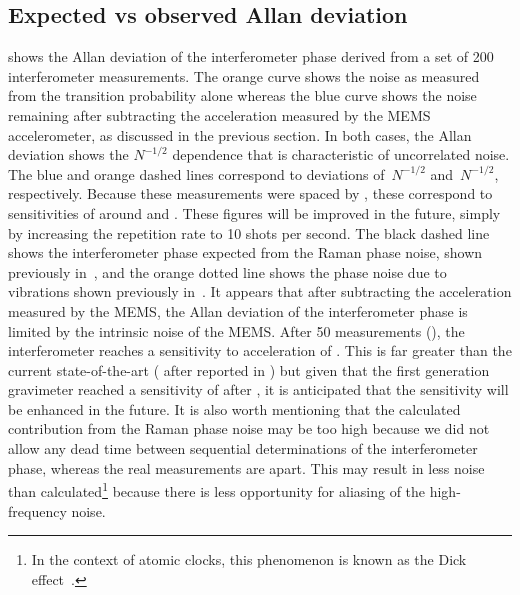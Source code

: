 \subsection{Expected vs observed Allan deviation}\label{subsec:stability}	
 shows the Allan deviation of the
interferometer phase derived from a set of 200 interferometer
measurements. The orange
curve shows the noise as measured from the transition probability
alone whereas the blue curve shows the noise remaining after
subtracting the acceleration measured by the MEMS accelerometer, as
discussed in the previous section. In both
cases, the Allan deviation shows the $N^{-1/2}$ dependence that is
characteristic of uncorrelated noise. The blue and orange dashed
lines correspond to deviations of
\,$N^{-1/2}$ and \,$N^{-1/2}$,
respectively.
Because these measurements were spaced by , these
correspond to sensitivities of around
 and
. These figures will be improved in the future, simply by
increasing the repetition rate to 10 shots per second. The black dashed line shows the interferometer phase
expected from the Raman phase noise, shown previously
in~, and the orange dotted line shows the
phase noise due to vibrations shown previously
in~. It appears that after subtracting the
acceleration measured by the MEMS, the Allan deviation of the
interferometer phase is limited by the intrinsic noise of the MEMS.
After 50 measurements (), the interferometer reaches a sensitivity to
acceleration of . This is far greater than
the current state-of-the-art ( after
 reported in \cite{Barrett2016}) but given that the
first generation gravimeter reached a sensitivity of
 after 
\cite{Kasevich1991}, it is anticipated that the sensitivity will be
enhanced in the future. 
It is also worth mentioning that the calculated contribution from the Raman phase noise may be
too high because we did not allow any dead time between sequential
determinations of the interferometer phase, whereas the real
measurements are  apart. This may result in less
noise than calculated\footnote{In the context of atomic clocks, this phenomenon
is known as the Dick effect~\cite{Dick1990}.} because there is less
opportunity for aliasing of the high-frequency noise. 
